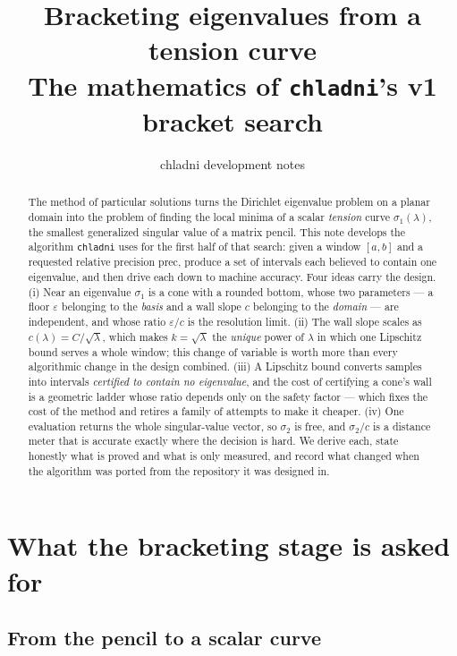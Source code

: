 \documentclass[11pt]{article}
\title{Bracketing eigenvalues from a tension curve\\
\large The mathematics of \texttt{chladni}'s v1 bracket search}
\author{chladni development notes}
\date{}
\theoremstyle{definition}
\theoremstyle{remark}
\newcommand{\code}[1]{\texttt{#1}}
\newcommand{\lam}{\lambda}
\newcommand{\sig}{\sigma}
\newcommand{\pr}{\mathrm{prec}}
\begin{document}
\maketitle

\begin{abstract}
\noindent
The method of particular solutions turns the Dirichlet eigenvalue problem on a planar domain
into the problem of finding the local minima of a scalar \emph{tension} curve
$\sig_1(\lam)$, the smallest generalized singular value of a matrix pencil. This note
develops the algorithm \code{chladni} uses for the first half of that search: given a window
$[a,b]$ and a requested relative precision $\pr$, produce a set of intervals each believed
to contain one eigenvalue, and then drive each down to machine accuracy. Four ideas carry the
design. (i) Near an eigenvalue $\sig_1$ is a cone with a rounded bottom, whose two parameters
--- a floor $\varepsilon$ belonging to the \emph{basis} and a wall slope $c$ belonging to the
\emph{domain} --- are independent, and whose ratio $\varepsilon/c$ is the resolution limit.
(ii) The wall slope scales as $c(\lam)=C/\sqrt{\lam}$, which makes $k=\sqrt{\lam}$ the
\emph{unique} power of $\lam$ in which one Lipschitz bound serves a whole window; this change
of variable is worth more than every algorithmic change in the design combined. (iii) A
Lipschitz bound converts samples into intervals \emph{certified to contain no eigenvalue}, and
the cost of certifying a cone's wall is a geometric ladder whose ratio depends only on the
safety factor --- which fixes the cost of the method and retires a family of attempts to make
it cheaper. (iv) One evaluation returns the whole singular-value vector, so $\sig_2$ is free,
and $\sig_2/c$ is a distance meter that is accurate exactly where the decision is hard. We
derive each, state honestly what is proved and what is only measured, and record what changed
when the algorithm was ported from the repository it was designed in.
\end{abstract}

\tableofcontents

\section{What the bracketing stage is asked for}
\label{sec:problem}

\subsection{From the pencil to a scalar curve}
\end{document}
